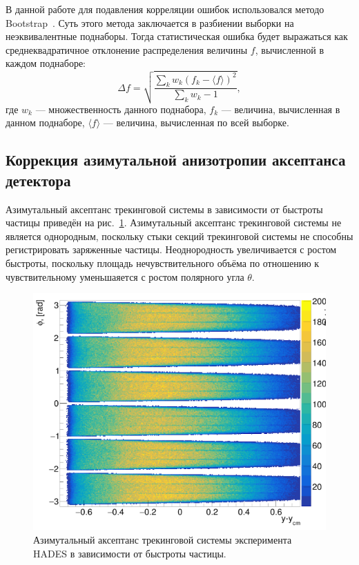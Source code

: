 В данной работе для подавления корреляции ошибок использовался методо Bootstrap~\cite{Bohm:2010}.
Суть этого метода заключается в разбиении выборки на неэквивалентные поднаборы.
Тогда статистическая ошибка будет выражаться как среднеквадратичное отклонение распределения величины $f$, вычисленной в каждом поднаборе:
\begin{equation}
    \Delta f = \sqrt{ \frac{ \sum_k w_k (f_k - \langle f \rangle )^2 }{ \sum_k w_k - 1 } },
\end{equation}
где $w_k$ --- множественность данного поднабора, $f_k$ --- величина, вычисленная в данном поднаборе, $\langle f \rangle$ --- величина, вычисленная по всей выборке.

\subsection{Коррекция азимутальной анизотропии аксептанса детектора}

Азимутальный аксептанс трекинговой системы в зависимости от быстроты частицы приведён на рис.~\ref{fig:hades_phi_y}.
Азимутальный аксептанс трекинговой системы не является однородным, поскольку стыки секций трекинговой системы не способны регистрировать заряженные частицы.
Неоднородность увеличивается с ростом быстроты, поскольку площадь нечувствительного объёма по отношению к чувствительному уменьшаяется с ростом полярного угла $\theta$. 
%
\begin{figure}[ht]
\begin{center}
\includegraphics[width=0.55\linewidth]{images/hades_phi_y.png}
\caption{Азимутальный аксептанс трекинговой системы эксперимента HADES в зависимости от быстроты частицы.}
\label{fig:hades_phi_y}
\end{center}
\end{figure}

